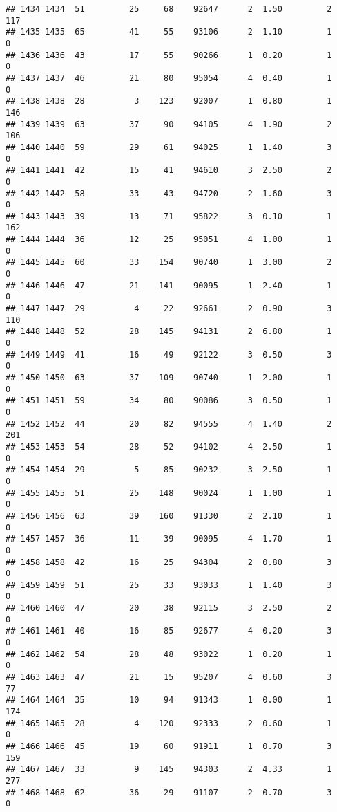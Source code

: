 \documentclass[
]{article}
\begin{document}
\begin{verbatim}
## 1434 1434  51         25     68    92647      2  1.50         2      117
## 1435 1435  65         41     55    93106      2  1.10         1        0
## 1436 1436  43         17     55    90266      1  0.20         1        0
## 1437 1437  46         21     80    95054      4  0.40         1        0
## 1438 1438  28          3    123    92007      1  0.80         1      146
## 1439 1439  63         37     90    94105      4  1.90         2      106
## 1440 1440  59         29     61    94025      1  1.40         3        0
## 1441 1441  42         15     41    94610      3  2.50         2        0
## 1442 1442  58         33     43    94720      2  1.60         3        0
## 1443 1443  39         13     71    95822      3  0.10         1      162
## 1444 1444  36         12     25    95051      4  1.00         1        0
## 1445 1445  60         33    154    90740      1  3.00         2        0
## 1446 1446  47         21    141    90095      1  2.40         1        0
## 1447 1447  29          4     22    92661      2  0.90         3      110
## 1448 1448  52         28    145    94131      2  6.80         1        0
## 1449 1449  41         16     49    92122      3  0.50         3        0
## 1450 1450  63         37    109    90740      1  2.00         1        0
## 1451 1451  59         34     80    90086      3  0.50         1        0
## 1452 1452  44         20     82    94555      4  1.40         2      201
## 1453 1453  54         28     52    94102      4  2.50         1        0
## 1454 1454  29          5     85    90232      3  2.50         1        0
## 1455 1455  51         25    148    90024      1  1.00         1        0
## 1456 1456  63         39    160    91330      2  2.10         1        0
## 1457 1457  36         11     39    90095      4  1.70         1        0
## 1458 1458  42         16     25    94304      2  0.80         3        0
## 1459 1459  51         25     33    93033      1  1.40         3        0
## 1460 1460  47         20     38    92115      3  2.50         2        0
## 1461 1461  40         16     85    92677      4  0.20         3        0
## 1462 1462  54         28     48    93022      1  0.20         1        0
## 1463 1463  47         21     15    95207      4  0.60         3       77
## 1464 1464  35         10     94    91343      1  0.00         1      174
## 1465 1465  28          4    120    92333      2  0.60         1        0
## 1466 1466  45         19     60    91911      1  0.70         3      159
## 1467 1467  33          9    145    94303      2  4.33         1      277
## 1468 1468  62         36     29    91107      2  0.70         3        0

\end{verbatim}
\end{document}
